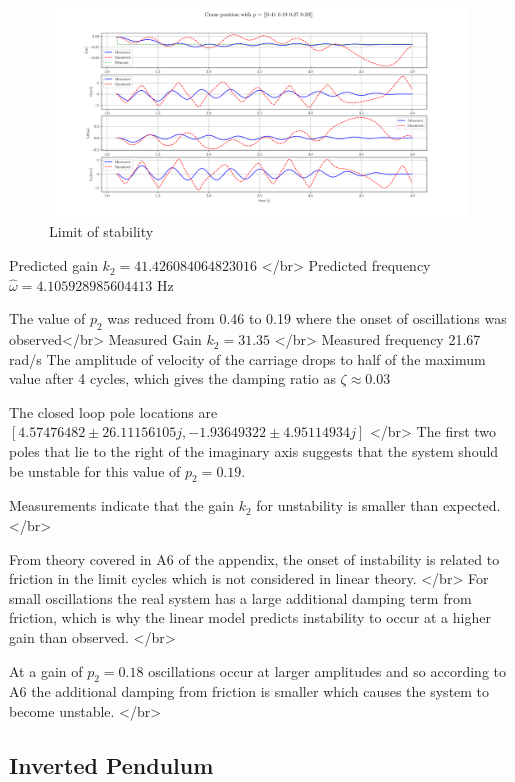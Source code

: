 \documentclass{article}
\begin{document}
\begin{figure}[H]
  \centering
  \includegraphics[width=0.99\textwidth]{figures/3.5.png}
  \caption{Limit of stability}
  \label{fig:exp3.5}
\end{figure}

Predicted gain $k_2 =   41.426084064823016$ </br>
Predicted frequency $\hat{\omega} = 4.105928985604413$ Hz

The value of $p_2$ was reduced from 0.46 to 0.19 where the onset of oscillations was observed</br>
Measured Gain $k_2 = 31.35$ </br>
Measured frequency 21.67 rad/s
The amplitude of velocity of the carriage drops to half of the maximum value after 4 cycles, which gives the damping ratio as $\zeta \approx 0.03$

The closed loop pole locations are $[ 4.57476482 \pm 26.11156105j , -1.93649322 \pm 4.95114934j]$ </br>
The first two poles that lie to the right of the imaginary axis suggests that the system should be unstable for this value of $p_2 = 0.19$.


Measurements indicate that the gain $k_2$ for unstability is smaller than expected. </br>

From theory covered in A6 of the appendix, the onset of instability is related to friction in the limit cycles which is not considered in linear theory. </br>
For small oscillations the real system has a large additional damping term from friction, which is why the linear model predicts instability to occur at a higher gain than observed. </br>

At a gain of $p_2 = 0.18$ oscillations occur at larger amplitudes and so according to A6 the additional damping from friction is smaller which causes the system to become unstable. </br> 

\subsection{Inverted Pendulum}
\end{document}
